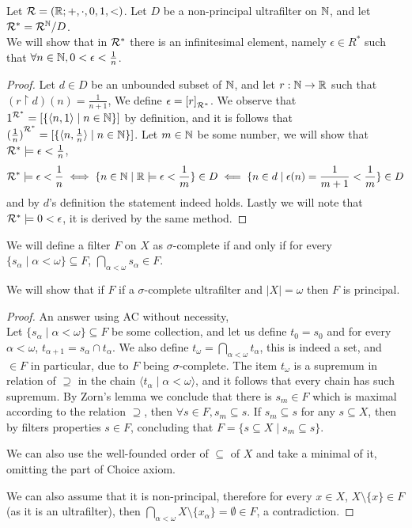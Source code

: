 \subquestion{}
Let $\mathcal{R} = (\mathbb{R}; +, \cdot, 0, 1, <)$.
Let $D$ be a non-principal ultrafilter on $\mathbb{N}$, and let $\mathcal{R}^* = \mathcal{R}^{\mathbb{N}} / D$. \\
We will show that in $\mathcal{R}^*$ there is an infinitesimal element, namely $\epsilon \in R^*$ such that $\forall n \in \mathbb{N}, 0 < \epsilon < \frac{1}{n}$.
\begin{proof}
	Let $d \in D$ be an unbounded subset of $\mathbb{N}$, and let $r : \mathbb{N} \to \mathbb{R}$ such that $(r \restriction d)(n) = \frac{1}{n + 1}$,
	We define $\epsilon = {[r]}_{\mathcal{R}^*}$.
	We observe that $1^{\mathcal{R}^*} = [\{ \langle n, 1 \rangle \mid n \in \mathbb{N} \}]$ by definition, and it is follows that ${(\frac{1}{n})}^{\mathcal{R}^*} = [\{ \langle n, \frac{1}{n} \rangle \mid n \in \mathbb{N} \}]$.
	Let $m \in \mathbb{N}$ be some number, we will show that $\mathcal{R}^* \models \epsilon < \frac{1}{n}$,
	\[
		\mathcal{R}^* \models \epsilon < \frac{1}{n}
		\iff \{ n \in \mathbb{N} \mid \mathbb{R} \models \epsilon < \frac{1}{m} \} \in D
		\impliedby \{ n \in d \mid \epsilon(n) = \frac{1}{m + 1} < \frac{1}{m} \} \in D
	\]
	and by $d$'s definition the statement indeed holds.
	Lastly we will note that $\mathcal{R}^* \models 0 < \epsilon$, it is derived by the same method.
\end{proof}

\question{}
We will define a filter $F$ on $X$ as $\sigma$-complete if and only if for every $\{ s_\alpha \mid \alpha < \omega \} \subseteq F$, $\bigcap_{\alpha < \omega} s_\alpha \in F$.

\subquestion{}
We will show that if $F$ if a $\sigma$-complete ultrafilter and $|X| = \omega$ then $F$ is principal.
\begin{proof}
	An answer using AC without necessity, \\
	Let $\{ s_\alpha \mid \alpha < \omega \} \subseteq F$ be some collection, and let us define $t_0 = s_0$ and for every $\alpha < \omega$, $t_{\alpha + 1} = s_\alpha \cap t_\alpha$.
	We also define $t_\omega = \bigcap_{\alpha < \omega} t_\alpha$, this is indeed a set, and $\in F$ in particular, due to $F$ being $\sigma$-complete.
	The item $t_\omega$ is a supremum in relation of $\supseteq$ in the chain $\langle t_\alpha \mid \alpha < \omega \rangle$, and it follows that every chain has such supremum.
	By Zorn's lemma we conclude that there is $s_m \in F$ which is maximal according to the relation $\supseteq$, then $\forall s \in F, s_m \subseteq s$.
	If $s_m \subseteq s$ for any $s \subseteq X$, then by filters properties $s \in F$, concluding that $F = \{ s \subseteq X \mid s_m \subseteq s \}$.

	We can also use the well-founded order of $\subseteq$ of $X$ and take a minimal of it, omitting the part of Choice axiom.

	We can also assume that it is non-principal, therefore for every $x \in X$, $X \setminus \{x\} \in F$ (as it is an ultrafilter), then $\bigcap_{\alpha < \omega} X \setminus \{ x_\alpha \} = \emptyset \in F$, a contradiction.
\end{proof}

